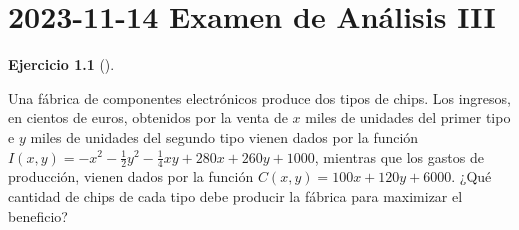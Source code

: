\documentclass[
  spanish,
  a4paper,
]{scrreport}
\theoremstyle{definition}
\newtheorem{exercise}{Ejercicio}[chapter]
\theoremstyle{remark}
\begin{document}
\chapter{\texorpdfstring{2023-11-14 Examen de Análisis
III}{2023-11-14  Examen de Análisis III}}\label{examen-de-anuxe1lisis-iii}

\begin{exercise}[]\protect\hypertarget{exr-1}{}\label{exr-1}

Una fábrica de componentes electrónicos produce dos tipos de chips. Los
ingresos, en cientos de euros, obtenidos por la venta de \(x\) miles de
unidades del primer tipo e \(y\) miles de unidades del segundo tipo
vienen dados por la función
\(I(x,y) = -x^2-\frac{1}{2}y^2-\frac{1}{4}xy+280x+260y+1000\), mientras
que los gastos de producción, vienen dados por la función
\(C(x,y) = 100x+120y+6000\). ¿Qué cantidad de chips de cada tipo debe
producir la fábrica para maximizar el beneficio?

\end{exercise}
\end{document}

